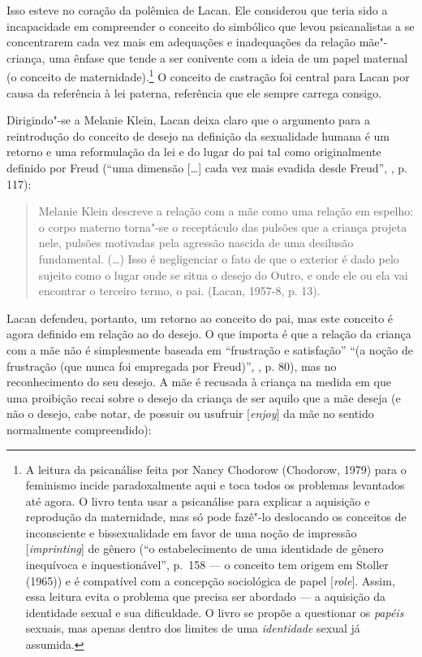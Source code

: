 Isso esteve no coração da polêmica de Lacan. Ele considerou que teria
sido a incapacidade em compreender o conceito do simbólico que levou
psicanalistas a se concentrarem cada vez mais em adequações e
inadequações da relação mãe"-criança, uma ênfase que tende a ser
conivente com a ideia de um papel maternal (o conceito de
maternidade).\footnote{A leitura da psicanálise feita por Nancy Chodorow
  (Chodorow, 1979) para o feminismo incide paradoxalmente aqui e toca
  todos os problemas levantados até agora. O livro tenta usar a
  psicanálise para explicar a aquisição e reprodução da maternidade, mas
  só pode fazê"-lo deslocando os conceitos de inconsciente e
  bissexualidade em favor de uma noção de impressão
  {[}\emph{imprinting}{]} de gênero (``o estabelecimento de uma
  identidade de gênero inequívoca e inquestionável'', p.~158 --- o
  conceito tem origem em Stoller (1965)) e é compatível com a concepção
  sociológica de papel {[}\emph{role}{]}. Assim, essa leitura evita o
  problema que precisa ser abordado --- a aquisição da identidade sexual
  e sua dificuldade. O livro se propõe a questionar os \emph{papéis}
  sexuais, mas apenas dentro dos limites de uma \emph{identidade} sexual
  já assumida.} O conceito de castração foi central para Lacan por
causa da referência à lei paterna, referência que ele sempre carrega
consigo.

Dirigindo"-se a Melanie Klein, Lacan deixa claro que o argumento para a
reintrodução do conceito de desejo na definição da sexualidade humana é
um retorno e uma reformulação da lei e do lugar do pai tal como
originalmente definido por Freud (``uma dimensão {[}\ldots{}{]} cada vez mais
evadida desde Freud'', , p. 117):

\begin{quote}
Melanie Klein descreve a relação com a mãe como uma relação em espelho:
o corpo materno torna"-se o receptáculo das pulsões que a criança projeta
nele, pulsões motivadas pela agressão nascida de uma desilusão
fundamental. (\ldots{}) Isso é negligenciar o fato de que o exterior é dado
pelo sujeito como o lugar onde se situa o desejo do Outro, e onde ele ou
ela vai encontrar o terceiro termo, o pai. (Lacan, 1957-8, p. 13).
\end{quote}

Lacan defendeu, portanto, um retorno ao conceito do pai, mas este
conceito é agora definido em relação ao do desejo. O que importa é que a
relação da criança com a mãe não é simplesmente baseada em ``frustração e
satisfação'' ``(a noção de frustração (que nunca foi empregada por %
Freud)'', , p. 80), mas no reconhecimento do seu desejo. A mãe é
recusada à criança na medida em que uma proibição recai sobre o desejo
da criança de ser aquilo que a mãe deseja (e não o desejo, cabe notar,
de possuir ou usufruir {[}\emph{enjoy}{]} da mãe no sentido normalmente
compreendido):

